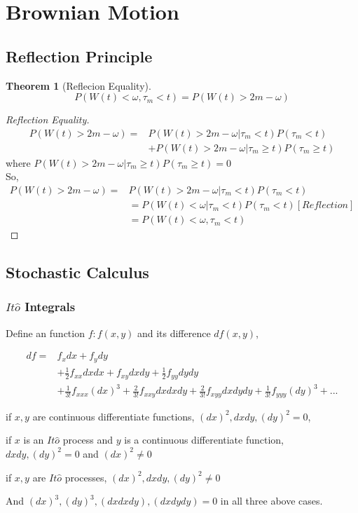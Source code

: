 \documentclass[a4]{article}
\newtheorem{theorem}{Theorem}
\begin{document}
\section{Brownian Motion}
\subsection{Reflection Principle}
\begin{theorem}[Reflecion Equality]
	$$
	P(W(t)<\omega, \tau_{m}<t) = P(W(t)>2m-\omega)
	$$
\end{theorem}
\begin{proof}[Reflection Equality]
$$
\begin{aligned}
	P(W(t)>2m - \omega) =& P(W(t)>2m - \omega|\tau_{m}<t)P(\tau_{m}<t) \\
	&+ P(W(t)>2m - \omega|\tau_{m}\geq t)P(\tau_{m}\geq t)
\end{aligned}
$$
where $P(W(t)>2m - \omega|\tau_{m}\geq t)P(\tau_{m}\geq t) = 0$\\
So, $$
\begin{aligned}
	P(W(t)>2m - \omega) =& P(W(t)>2m - \omega|\tau_{m}<t)P(\tau_{m}<t)\\
	&=P(W(t)<\omega |\tau_{m}<t)P(\tau_{m}<t)[Reflection]\\
	&=	P(W(t)<\omega, \tau_{m}<t)
\end{aligned}
	$$
\end{proof}
\subsection{Stochastic Calculus}
\subsubsection{$It\hat o$ Integrals}
Define an function $f:f(x,y)$ and its difference $df(x,y)$,\par 
\begin{equation}
\begin{aligned}
d f=& f_{x}dx + f_{y}dy \\
&+ \frac{1}{2}f_{xx}dx dx + f_{xy}dxdy + \frac{1}{2}f_{yy}dy dy  \\
&+ \frac{1}{3!}f_{xxx}(dx)^{3}+\frac{2}{3!}f_{xxy}dx dx dy+\frac{2}{3!}f_{xyy}dx dy dy  + \frac{1}{3!}f_{yyy}(dy)^{3} + ...
\end{aligned}
\end{equation}\par 
if $x,y$ are continuous differentiate functions, $(dx)^{2},dxdy,(dy)^{2} = 0$,\\
\par 
if $x$ is an $It\hat o$ process and $y$ is a continuous differentiate function, $dxdy,(dy)^{2} = 0$ and $(dx)^{2}\neq 0$\\
\par 
if $x,y$ are  $It\hat o$ processes, $(dx)^{2},dxdy,(dy)^{2} \neq 0$\\
\par 
\noindent And $(dx)^{3},(dy)^{3},(dxdxdy),(dxdydy)=0$ in all three above cases.\\
\par 
\end{document}
